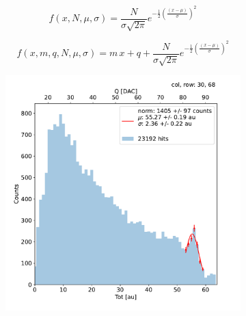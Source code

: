         
        \begin{equation}
            f(x, N, \mu, \sigma) = \frac{N}{\sigma \sqrt{2\pi}} e^{-\frac{1}{2}(\frac{(x-\mu)}{\sigma})^2}
        \end{equation} 

        \begin{equation}
            f(x, m, q, N, \mu, \sigma) = m\,x + q + \frac{N}{\sigma \sqrt{2\pi}} e^{-\frac{1}{2}(\frac{(x-\mu)}{\sigma})^2}
        \end{equation}   
         
        \begin{figure}[h!]
            \begin{subfigure}{.5\textwidth}
            \centering
            \includegraphics[width=.99\linewidth]{figures/charaterization/fit_gauss_r69.pdf}
            \label{fig:}
            \end{subfigure}
            \begin{subfigure}{.5\textwidth}
            \centering

\end{subfigure}
\end{figure}
